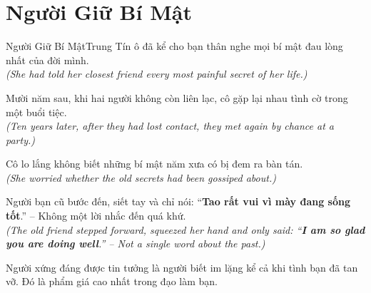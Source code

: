 \section{Người Giữ Bí Mật}
\begin{truyen}{Người Giữ Bí Mật}{Trung Tín}
ô đã kể cho bạn thân nghe mọi bí mật đau lòng nhất của đời mình.\\
\textit{(She had told her closest friend every most painful secret of her life.)}

Mười năm sau, khi hai người không còn liên lạc, cô gặp lại nhau tình cờ trong một buổi tiệc.\\
\textit{(Ten years later, after they had lost contact, they met again by chance at a party.)}

Cô lo lắng không biết những bí mật năm xưa có bị đem ra bàn tán.\\
\textit{(She worried whether the old secrets had been gossiped about.)}

Người bạn cũ bước đến, siết tay và chỉ nói: ``\textbf{Tao rất vui vì mày đang sống tốt}.'' – Không một lời nhắc đến quá khứ.\\
\textit{(The old friend stepped forward, squeezed her hand and only said: ``\textbf{I am so glad you are doing well}.'' – Not a single word about the past.)}
\end{truyen}
\begin{baihoc}
  Người xứng đáng được tin tưởng là người biết im lặng kể cả khi tình bạn đã tan vỡ. Đó là phẩm giá cao nhất trong đạo làm bạn.
\end{baihoc}

